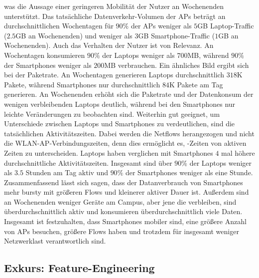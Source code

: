 \documentclass[12pt, a4paper]{article}
\begin{document}
was die Aussage einer geringeren Mobilität der Nutzer an Wochenenden unterstützt. \cite{Alipour2018}
Das tatsächliche Datenverkehr-Volumen der APs beträgt an durchschnittlichen Wochentagen für $90 \%$ der APs
weniger als $5$\textsc{GB} Laptop-Traffic ($2.5$\textsc{GB} an Wochenenden) und weniger als $3$\textsc{GB} Smartphone-Traffic
($1$\textsc{GB} an Wochenenden). Auch das Verhalten der Nutzer ist von Relevanz. An Wochentagen konsumieren $90 \%$ der 
Laptops weniger als $700$\textsc{MB}, während $90 \%$ der Smartphones weniger als $200$\textsc{MB} verbrauchen.
Ein ähnliches Bild ergibt sich bei der Paketrate. An Wochentagen generieren Laptops durchschnittlich $318$\textsc{K} Pakete, 
während Smartphones nur durchschnittlich $84$\textsc{K} Pakete am Tag generieren. 
An Wochenenden erhöht sich die Paketrate und der Datenkonsum der wenigen verbleibenden Laptops deutlich,
während bei den Smartphones nur leichte Veränderungen zu beobachten sind.
Weiterhin gut geeignet, um Unterschiede zwischen Laptops und Smartphones zu verdeutlichen, sind die tatsächlichen Aktivitätszeiten.
Dabei werden die Netflows herangezogen und nicht die WLAN-AP-Verbindungszeiten, denn dies ermöglicht es, -Zeiten
von aktiven Zeiten zu unterscheiden. Laptops haben verglichen mit Smartphones $4$ mal höhere durchschnittliche Aktivitätszeiten.
Insgesamt sind über $90 \%$ der Laptops weniger als $3.5$ Stunden am Tag aktiv und $90 \%$ der Smartphones weniger als eine Stunde.\newline
Zusammenfassend lässt sich sagen, dass der Datanverbrauch von Smartphones mehr bursty mit größeren Flows und kleinerer aktiver
Dauer ist. Außerdem sind an Wochenenden weniger Geräte am Campus, aber jene die verbleiben, sind überdurchschnittlich aktiv 
und konsumieren überdurchschnittlich viele Daten. Insgesamt ist festzuhalten, dass Smartphones mobiler sind, 
eine größere Anzahl von APs besuchen, größere Flows haben und trotzdem für insgesamt weniger Netzwerklast verantwortlich sind.

\subsection{Exkurs: Feature-Engineering}
\label{sec:digression}
\end{document}

